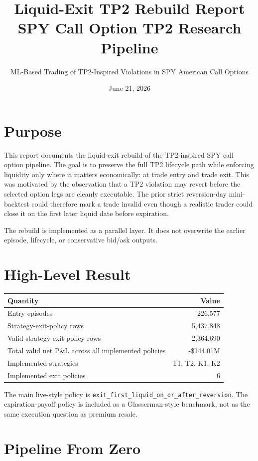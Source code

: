 \documentclass[11pt]{article}
\title{Liquid-Exit TP2 Rebuild Report\\\large SPY Call Option TP2 Research Pipeline}
\author{ML-Based Trading of TP2-Inspired Violations in SPY American Call Options}
\date{June 21, 2026}
\begin{document}
\maketitle

\section{Purpose}

This report documents the liquid-exit rebuild of the TP2-inspired SPY call option pipeline. The
goal is to preserve the full TP2 lifecycle path while enforcing liquidity only where it matters
economically: at trade entry and trade exit. This was motivated by the observation that a TP2
violation may revert before the selected option legs are cleanly executable. The prior strict
reversion-day mini-backtest could therefore mark a trade invalid even though a realistic trader
could close it on the first later liquid date before expiration.

The rebuild is implemented as a parallel layer. It does not overwrite the earlier episode,
lifecycle, or conservative bid/ask outputs.

\section{High-Level Result}

\begin{center}
\begin{tabular}{lr}
\toprule
Quantity & Value \\
\midrule
Entry episodes & 226,577 \\
Strategy-exit-policy rows & 5,437,848 \\
Valid strategy-exit-policy rows & 2,364,690 \\
Total valid net P\&L across all implemented policies & -\$144.01M \\
Implemented strategies & T1, T2, K1, K2 \\
Implemented exit policies & 6 \\
\bottomrule
\end{tabular}
\end{center}

The main live-style policy is \texttt{exit\_first\_liquid\_on\_or\_after\_reversion}. The
expiration-payoff policy is included as a Glasserman-style benchmark, not as the same execution
question as premium resale.

\section{Pipeline From Zero}
\end{document}
